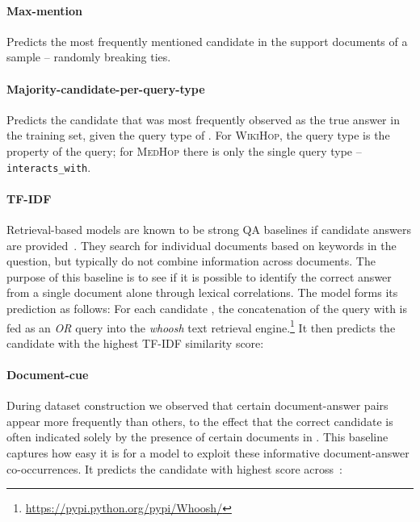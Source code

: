 \documentclass[11pt,letterpaper]{article}
\newcommand{\MedHop}{\textsc{MedHop}\xspace}
\newcommand{\WikiHop}{\textsc{WikiHop}\xspace}
\begin{document}
\paragraph{Max-mention}
Predicts the most frequently mentioned candidate in the support documents  of a sample -- randomly breaking ties. 


\paragraph{Majority-candidate-per-query-type}Predicts the candidate  that was most frequently observed as the true answer in the training set, given the query type of .
For \WikiHop, the query type is the property  of the query; for \MedHop there is only the single query type -- {\smaller \texttt{interacts\_with}}.


\paragraph{TF-IDF}
Retrieval-based models are known to be strong QA baselines if candidate answers are provided~\cite{clar_2016_combining,welbl2017crowdsourcing}.
They search for individual documents based on keywords in the question, but typically do not combine information across documents.
The purpose of this baseline is to see if it is possible to identify the correct answer from a single document alone through lexical correlations.
The model forms its prediction as follows:
For each candidate , the concatenation of the query  with  is fed as an \emph{OR} query into the \emph{whoosh} text retrieval engine.\footnote{
    \url{https://pypi.python.org/pypi/Whoosh/}
}
It then predicts the candidate with the highest TF-IDF similarity score:



\paragraph{Document-cue} 
During dataset construction we observed that certain document-answer pairs appear more frequently than others, to the effect that the correct candidate is often indicated solely by the presence of certain documents in .
This baseline captures how easy it is for a model to exploit these informative document-answer co-occurrences.
It predicts the candidate with highest score across~:
\end{document}
